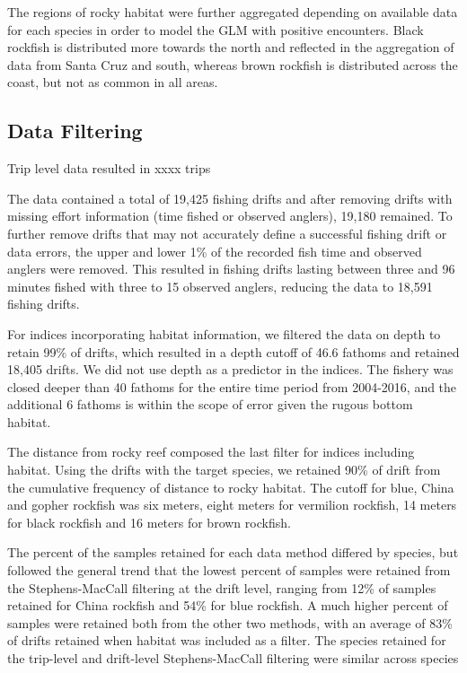 \documentclass[
  authoryear,
  preprint,
  3p]{elsarticle}
\begin{document}
The regions of rocky habitat were further aggregated depending on
available data for each species in order to model the GLM with positive
encounters. Black rockfish is distributed more towards the north and
reflected in the aggregation of data from Santa Cruz and south, whereas
brown rockfish is distributed across the coast, but not as common in all
areas.

\hypertarget{data-filtering}{%
\subsection{Data Filtering}\label{data-filtering}}

Trip level data resulted in xxxx trips

The data contained a total of 19,425 fishing drifts and after removing
drifts with missing effort information (time fished or observed
anglers), 19,180 remained. To further remove drifts that may not
accurately define a successful fishing drift or data errors, the upper
and lower 1\% of the recorded fish time and observed anglers were
removed. This resulted in fishing drifts lasting between three and 96
minutes fished with three to 15 observed anglers, reducing the data to
18,591 fishing drifts.

For indices incorporating habitat information, we filtered the data on
depth to retain 99\% of drifts, which resulted in a depth cutoff of 46.6
fathoms and retained 18,405 drifts. We did not use depth as a predictor
in the indices. The fishery was closed deeper than 40 fathoms for the
entire time period from 2004-2016, and the additional 6 fathoms is
within the scope of error given the rugous bottom habitat.

The distance from rocky reef composed the last filter for indices
including habitat. Using the drifts with the target species, we retained
90\% of drift from the cumulative frequency of distance to rocky
habitat. The cutoff for blue, China and gopher rockfish was six meters,
eight meters for vermilion rockfish, 14 meters for black rockfish and 16
meters for brown rockfish.

The percent of the samples retained for each data method differed by
species, but followed the general trend that the lowest percent of
samples were retained from the Stephens-MacCall filtering at the drift
level, ranging from 12\% of samples retained for China rockfish and 54\%
for blue rockfish. A much higher percent of samples were retained both
from the other two methods, with an average of 83\% of drifts retained
when habitat was included as a filter. The species retained for the
trip-level and drift-level Stephens-MacCall filtering were similar
across species
\end{document}
